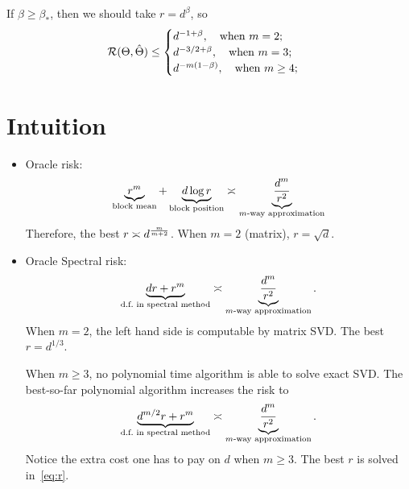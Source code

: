 \documentclass[10pt]{article}
\newcommand*{\KeepStyleUnderBrace}[1]{%
  \mathop{%
    \mathchoice
    {\underbrace{\displaystyle#1}}%
    {\underbrace{\textstyle#1}}%
    {\underbrace{\scriptstyle#1}}%
    {\underbrace{\scriptscriptstyle#1}}%
  }\limits
}
\theoremstyle{definition}
\theoremstyle{definition}
\newtheorem{questions}{Questions}
\theoremstyle{definition}
\begin{document}
 If $\beta\geq \beta_*$, then we should take $r=d^\beta$, so
 \[
 \mathcal{R}(\Theta,\hat \Theta) \leq 
 \begin{cases}
 d^{-1+\beta}, \quad \text{when }m=2;\\
  d^{-3/2+\beta} , \quad \text{when }m= 3;\\
 d^{-m(1-\beta)}, \quad \text{when }m\geq 4;\\
 \end{cases}
 \]

\section{Intuition}
\begin{itemize}
\item Oracle risk:
\[
\KeepStyleUnderBrace{r^m}_{\text{block mean}} +\KeepStyleUnderBrace{d\log r}_{\text{block position}} \asymp \KeepStyleUnderBrace{d^m\over r^2}_{\text{$m$-way approximation}}
\]
Therefore, the best $r\asymp d^{m\over m+2}$. When $m=2$ (matrix), $r=\sqrt{d}$. 
\item Oracle Spectral risk:
\[
\KeepStyleUnderBrace{dr+r^m}_{\text{d.f.\ in spectral method}}\asymp \KeepStyleUnderBrace{d^m\over r^2}_{\text{$m$-way approximation}}. 
\]
When $m=2$, the left hand side is computable by matrix SVD. The best $r=d^{1/3}$. 

When $m\geq 3$, no polynomial time algorithm is able to solve exact SVD. The best-so-far polynomial algorithm increases the risk to
\[
\KeepStyleUnderBrace{d^{m/2}r+r^m}_{\text{d.f.\ in spectral method}}\asymp \KeepStyleUnderBrace{d^m\over r^2}_{\text{$m$-way approximation}}. 
\]
Notice the extra cost one has to pay on $d$ when $m\geq 3$. The best $r$ is solved in~\eqref{eq:r}. 
\end{itemize}



\end{document}

